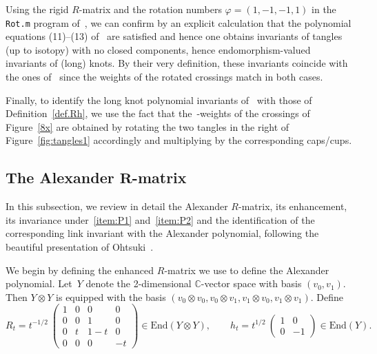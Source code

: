 \documentclass[10pt,a4paper]{amsart}
\numberwithin{equation}{section}
\theoremstyle{definition}
\begin{document}
Using the rigid $R$-matrix and the rotation numbers $\varphi=(1,-1,-1,1)$ in the
\texttt{Rot.m} program of~\cite[Section~2]{BNV:PG}, we can confirm by an explicit
calculation that the polynomial equations (11)--(13) of~\cite{BNV:PG} are satisfied
and hence one obtains invariants of tangles (up to isotopy) with no closed
components, hence endomorphism-valued invariants of (long) knots. By their very
definition, these invariants coincide with the ones of~\cite{GK:multi} since the weights
of the rotated crossings match in both cases.

Finally, to identify the long knot polynomial invariants of~\cite{GK:multi} with those
of Definition~\ref{def.Rh}, we use the fact that the~\cite{GK:multi}-weights of the
crossings of Figure~\ref{8x} are obtained by rotating the two tangles in the
right of Figure~\ref{fig:tangles1} accordingly and multiplying by the corresponding
caps/cups.

\subsection[The Alexander R-matrix]{The Alexander $\boldsymbol{R}$-matrix}
\label{sub:alex}

In this subsection, we review in detail the Alexander $R$-matrix, its enhancement,
its invariance under~\eqref{item:P1} and~\eqref{item:P2} and the identification
of the corresponding link invariant with the Alexander polynomial, following
the beautiful presentation of Ohtsuki~\cite{Ohtsuki}.

We begin by defining the enhanced $R$-matrix we use to define the Alexander polynomial.
Let~$Y$ denote the 2-dimensional $\mathbb{C}$-vector space with basis
$(v_0, v_1)$. Then $Y \otimes Y$ is equipped with the basis
$(v_0 \otimes v_0, v_0 \otimes v_1, v_1 \otimes v_0, v_1 \otimes v_1)$.
Define
\begin{equation}
\label{alexRh}
R_t = t^{-1/2}~\begin{pmatrix}
1 & 0 & 0 & 0 \\
0 & 0 & 1 & 0 \\
0 & t & 1-t & 0 \\
0 & 0 & 0 & -t
\end{pmatrix} \in \mathrm{End}(Y \otimes Y), \qquad h_t = t^{1/2}~\begin{pmatrix}
1 & 0 \\
0 & -1
\end{pmatrix} \in \mathrm{End}(Y) .
\end{equation}
\end{document}
